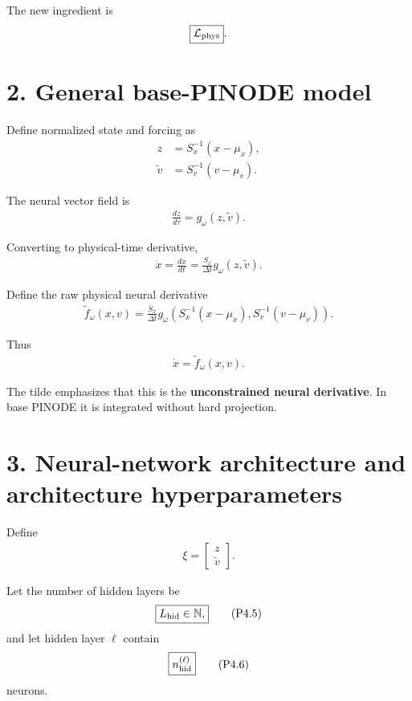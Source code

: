 \documentclass[11pt]{article}
\begin{document}
The new ingredient is
\begin{align}
\boxed{\mathcal L_{\rm phys}}.
\end{align}

\section*{2. General base-PINODE model}

Define normalized state and forcing as
\begin{align}
z&=S_x^{-1}(x-\mu_x),\\
\widetilde v&=S_v^{-1}(v-\mu_v).
\end{align}

The neural vector field is
\begin{align}
\boxed{\frac{dz}{d\tau}=g_\omega(z,\widetilde v).}
\tag{P4.1}
\end{align}

Converting to physical-time derivative,
\begin{align}
\boxed{
\dot x
=
\frac{dx}{dt}
=
\frac{S_x}{\Delta t}
g_\omega(z,\widetilde v).
}
\tag{P4.2}
\end{align}

Define the raw physical neural derivative
\begin{align}
\boxed{
\widetilde f_\omega(x,v)
=
\frac{S_x}{\Delta t}
g_\omega
\left(
S_x^{-1}(x-\mu_x),
S_v^{-1}(v-\mu_v)
\right).
}
\tag{P4.3}
\end{align}

Thus
\begin{align}
\boxed{\dot x=\widetilde f_\omega(x,v).}
\tag{P4.4}
\end{align}

The tilde emphasizes that this is the \textbf{unconstrained neural derivative}. In base PINODE it is integrated without hard projection.

\section*{3. Neural-network architecture and architecture hyperparameters}

Define
\begin{align}
\xi=
\begin{bmatrix}
z\\
\widetilde v
\end{bmatrix}.
\end{align}

Let the number of hidden layers be
\begin{align}
\boxed{L_{\rm hid}\in\mathbb N,}
\tag{P4.5}
\end{align}
and let hidden layer \(\ell\) contain
\begin{align}
\boxed{n_{\rm hid}^{(\ell)}}
\tag{P4.6}
\end{align}
neurons.
\end{document}
